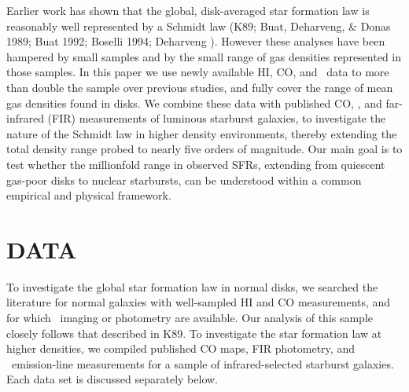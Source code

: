 Earlier work has shown that the global, disk-averaged star formation 
law is reasonably well represented by a Schmidt law (K89; Buat, Deharveng, 
\& Donas 1989; Buat 1992; Boselli 1994; Deharveng ).  However
these analyses have been hampered by small samples and by the small  
range of gas densities represented in those 
samples.  In this paper we use newly 
available HI, CO, and \halpha\ data to more than double the sample over
previous studies, and fully cover the range of mean gas 
densities found in disks.  We combine these data with published CO, 
\brgamma, and far-infrared (FIR) measurements of luminous 
starburst galaxies, to investigate the nature of the Schmidt law in  
higher density environments, thereby 
extending the total density range probed to nearly five orders of 
magnitude.  Our main goal is to  
test whether the millionfold range in observed SFRs,  
extending from quiescent gas-poor disks to nuclear starbursts, 
can be understood within a common empirical and physical framework. 


\section{DATA}

To investigate the global star formation law in normal disks, we searched 
the literature for normal galaxies with well-sampled HI and CO 
measurements, and for which \halpha\ imaging or photometry are available.  Our 
analysis of this sample closely follows that described in K89.  To investigate 
the star formation law at higher densities, we compiled published CO maps, 
FIR photometry, and \brgamma\ emission-line measurements for a sample of 
infrared-selected starburst galaxies.  Each data set is discussed 
separately below.

